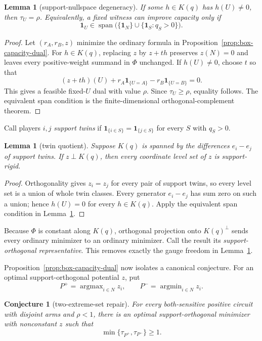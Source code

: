 \documentclass[11pt]{article}
\newtheorem{lemma}[theorem]{Lemma}
\newtheorem{conjecture}[theorem]{Conjecture}
\begin{document}
\begin{lemma}[support-nullspace degeneracy]
\label{lem:support-nullspace}
If some $h\in K(q)$ has $h(U)\neq0$, then $\tau_U=\rho$. Equivalently, a
fixed witness can improve capacity only if
\[
 \mathbf1_U\in\operatorname{span}
 \bigl(\{\mathbf1_N\}\cup\{\mathbf1_S:q_S>0\}\bigr).
\]
\end{lemma}

\begin{proof}
Let $(r_A,r_B,z)$ minimize the ordinary formula in
Proposition~\ref{prop:box-capacity-dual}. For $h\in K(q)$, replacing $z$ by
$z+th$ preserves $z(N)=0$ and leaves every positive-weight summand in
$\Phi$ unchanged. If $h(U)\neq0$, choose $t$ so that
\[
 (z+th)(U)+r_A\mathbf1_{\{U=A\}}-r_B\mathbf1_{\{U=B\}}=0.
\]
This gives a feasible fixed-$U$ dual with value $\rho$. Since
$\tau_U\geq\rho$, equality follows. The equivalent span condition is the
finite-dimensional orthogonal-complement theorem.
\end{proof}

Call players $i,j$ \emph{support twins} if
$\mathbf1_{\{i\in S\}}=\mathbf1_{\{j\in S\}}$ for every $S$ with $q_S>0$.

\begin{lemma}[twin quotient]
\label{lem:twin-quotient}
Suppose $K(q)$ is spanned by the differences $e_i-e_j$ of support twins. If
$z\perp K(q)$, then every coordinate level set of $z$ is support-rigid.
\end{lemma}

\begin{proof}
Orthogonality gives $z_i=z_j$ for every pair of support twins, so every level
set is a union of whole twin classes. Every generator $e_i-e_j$ has sum zero
on such a union; hence $h(U)=0$ for every $h\in K(q)$. Apply the equivalent
span condition in Lemma~\ref{lem:support-nullspace}.
\end{proof}

Because $\Phi$ is constant along $K(q)$, orthogonal projection onto
$K(q)^\perp$ sends every ordinary minimizer to an ordinary minimizer. Call
the result its \emph{support-orthogonal representative}. This removes exactly
the gauge freedom in Lemma~\ref{lem:support-nullspace}.

Proposition~\ref{prop:box-capacity-dual} now isolates a canonical conjecture.
For an optimal support-orthogonal potential $z$, put
\[
 P^+=\operatorname{argmax}_{i\in N}z_i,\qquad
 P^-=\operatorname{argmin}_{i\in N}z_i.
\]

\begin{conjecture}[two-extreme-set repair]
\label{conj:two-extreme-repair}
For every both-sensitive positive circuit with disjoint arms and $\rho<1$,
there is an optimal support-orthogonal minimizer with nonconstant $z$ such that
\[
 \min\{\tau_{P^+},\tau_{P^-}\}\geq1.
\]
\end{conjecture}
\end{document}
